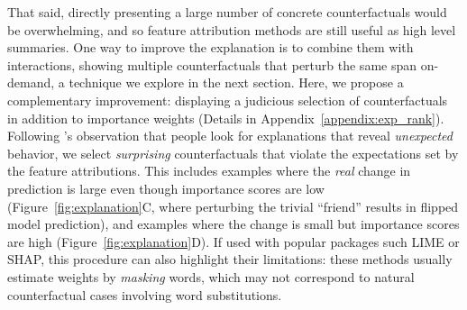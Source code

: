 That said, directly presenting a large number of concrete counterfactuals would be overwhelming, and so feature attribution methods are still useful as high level summaries.
One way to improve the explanation is to combine them with interactions, showing multiple \sysname counterfactuals that perturb the same span on-demand, a technique we explore in the next section. 
Here, we propose a complementary improvement: displaying a judicious selection of \sysname counterfactuals in addition to importance weights (Details in Appendix~\ref{appendix:exp_rank}). 
Following \citet{miller}'s observation that people look for explanations that reveal \emph{unexpected} behavior, we select \emph{surprising} counterfactuals that violate the expectations set by the feature attributions.
This includes examples where the \emph{real} change in prediction is large even though importance scores are low (Figure~\ref{fig:explanation}C, where perturbing the trivial ``friend'' results in flipped model prediction), and examples where the change is small but importance scores are high (Figure~\ref{fig:explanation}D).
%
If used with popular packages such LIME or SHAP, this procedure can also highlight their limitations: 
these methods usually estimate weights by \emph{masking} words, which may not correspond to natural counterfactual cases involving \eg word substitutions.








